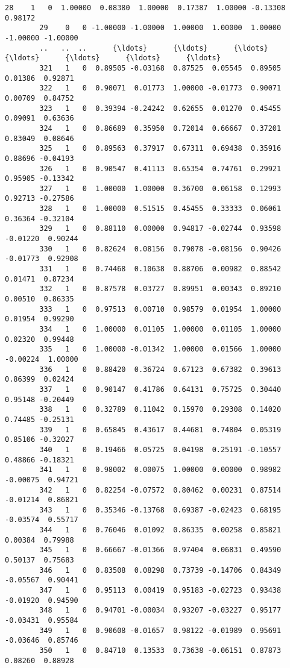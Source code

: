 \documentclass[11pt]{article}
\begin{document}
\begin{Verbatim}[commandchars=\\\{\}]
        28    1   0  1.00000  0.08380  1.00000  0.17387  1.00000 -0.13308  0.98172   
        29    0   0 -1.00000 -1.00000  1.00000  1.00000  1.00000 -1.00000 -1.00000   
        ..   ..  ..      {\ldots}      {\ldots}      {\ldots}      {\ldots}      {\ldots}      {\ldots}      {\ldots}   
        321   1   0  0.89505 -0.03168  0.87525  0.05545  0.89505  0.01386  0.92871   
        322   1   0  0.90071  0.01773  1.00000 -0.01773  0.90071  0.00709  0.84752   
        323   1   0  0.39394 -0.24242  0.62655  0.01270  0.45455  0.09091  0.63636   
        324   1   0  0.86689  0.35950  0.72014  0.66667  0.37201  0.83049  0.08646   
        325   1   0  0.89563  0.37917  0.67311  0.69438  0.35916  0.88696 -0.04193   
        326   1   0  0.90547  0.41113  0.65354  0.74761  0.29921  0.95905 -0.13342   
        327   1   0  1.00000  1.00000  0.36700  0.06158  0.12993  0.92713 -0.27586   
        328   1   0  1.00000  0.51515  0.45455  0.33333  0.06061  0.36364 -0.32104   
        329   1   0  0.88110  0.00000  0.94817 -0.02744  0.93598 -0.01220  0.90244   
        330   1   0  0.82624  0.08156  0.79078 -0.08156  0.90426 -0.01773  0.92908   
        331   1   0  0.74468  0.10638  0.88706  0.00982  0.88542  0.01471  0.87234   
        332   1   0  0.87578  0.03727  0.89951  0.00343  0.89210  0.00510  0.86335   
        333   1   0  0.97513  0.00710  0.98579  0.01954  1.00000  0.01954  0.99290   
        334   1   0  1.00000  0.01105  1.00000  0.01105  1.00000  0.02320  0.99448   
        335   1   0  1.00000 -0.01342  1.00000  0.01566  1.00000 -0.00224  1.00000   
        336   1   0  0.88420  0.36724  0.67123  0.67382  0.39613  0.86399  0.02424   
        337   1   0  0.90147  0.41786  0.64131  0.75725  0.30440  0.95148 -0.20449   
        338   1   0  0.32789  0.11042  0.15970  0.29308  0.14020  0.74485 -0.25131   
        339   1   0  0.65845  0.43617  0.44681  0.74804  0.05319  0.85106 -0.32027   
        340   1   0  0.19466  0.05725  0.04198  0.25191 -0.10557  0.48866 -0.18321   
        341   1   0  0.98002  0.00075  1.00000  0.00000  0.98982 -0.00075  0.94721   
        342   1   0  0.82254 -0.07572  0.80462  0.00231  0.87514 -0.01214  0.86821   
        343   1   0  0.35346 -0.13768  0.69387 -0.02423  0.68195 -0.03574  0.55717   
        344   1   0  0.76046  0.01092  0.86335  0.00258  0.85821  0.00384  0.79988   
        345   1   0  0.66667 -0.01366  0.97404  0.06831  0.49590  0.50137  0.75683   
        346   1   0  0.83508  0.08298  0.73739 -0.14706  0.84349 -0.05567  0.90441   
        347   1   0  0.95113  0.00419  0.95183 -0.02723  0.93438 -0.01920  0.94590   
        348   1   0  0.94701 -0.00034  0.93207 -0.03227  0.95177 -0.03431  0.95584   
        349   1   0  0.90608 -0.01657  0.98122 -0.01989  0.95691 -0.03646  0.85746   
        350   1   0  0.84710  0.13533  0.73638 -0.06151  0.87873  0.08260  0.88928   
        

\end{Verbatim}
\end{document}
